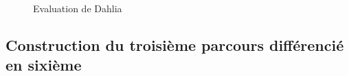 \begin{figure}[!h]
	\caption{Evaluation de Dahlia}
	\label{fig:Eval_Dahlia}
\end{figure}

\subsection{Construction du troisième parcours différencié en sixième}
